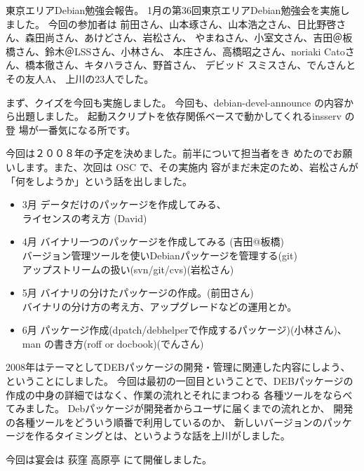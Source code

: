 \documentclass[mingoth,a4paper]{jsarticle}
\begin{document}

東京エリアDebian勉強会報告。
1月の第36回東京エリアDebian勉強会を実施しました。
今回の参加者は
前田さん、山本琢さん、山本浩之さん、日比野啓さん、森田尚さん、あけどさん、岩松さん、
やまねさん、小室文さん、吉田＠板橋さん、鈴木＠LSSさん、小林さん、
本庄さん、高橋昭之さん、noriaki Catoさん、橋本徹さん、キタハラさん、野首さん、
デビッド スミスさん、でんさんとその友人A、
上川の23人でした。

まず、クイズを今回も実施しました。
今回も、debian-devel-announce の内容から出題しました。
起動スクリプトを依存関係ベースで動かしてくれるinsserv の登
場が一番気になる所です。

今回は２００８年の予定を決めました。前半について担当者をき
めたのでお願いします。また、次回は OSC で、その実施内
容がまだ未定のため、岩松さんが「何をしようか」という話を出しました。

\begin{itemize}
 \item  3月 データだけのパッケージを作成してみる、\\
 ライセンスの考え方 (David)
 \item  4月 バイナリ一つのパッケージを作成してみる (吉田@板橋)\\
 バージョン管理ツールを使いDebianパッケージを管理する(git)\\
 アップストリームの扱い(svn/git/cvs)(岩松さん)
 \item  5月 バイナリの分けたパッケージの作成。(前田さん)\\
 バイナリの分け方の考え方、アップグレードなどの運用とか。
 \item  6月 パッケージ作成(dpatch/debhelperで作成するパッケージ)(小林さん)、\\
 man の書き方(roff or docbook)(でんさん)
\end{itemize}

2008年はテーマとしてDEBパッケージの開発・管理に関連した内容にしよう、ということにしました。
今回は最初の一回目ということで、DEBパッケージの作成の中身の詳細ではなく、作業の流れとそれにまつわる
各種ツールをならべてみました。
Debパッケージが開発者からユーザに届くまでの流れとか、
開発の各種ツールをどういう順番で利用しているのか、
新しいバージョンのパッケージを作るタイミングとは、というような話を上川がしました。

今回は宴会は
荻窪 高原亭
にて開催しました。

\label{sec:osc2008spring}
\end{document}
